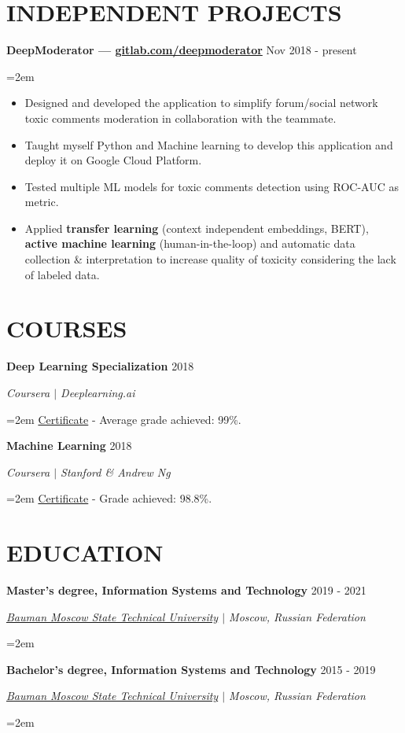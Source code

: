 \documentclass{article}
\newcommand{\NewPart}[1]{\section*{{\color{gray}\uppercase{#1}}}}
\newcommand{\ExperienceEntry}[4]{
		\noindent \textbf{#1} \hfill  
		\hfill #2 \par  %
		\noindent \textit{#3} \par        %
		\noindent\hangindent=2em\hangafter=0 \small #4 %
		\normalsize \par}
\begin{document}
\NewPart{Independent Projects}{}
\ExperienceEntry
{DeepModerator  --- {\href{https://gitlab.com/deepmoderator} {gitlab.com/deepmoderator}}}
{Nov 2018 - present}
{}
{\begin{itemize}
	\item{Designed and developed the application to simplify forum/social network toxic comments moderation in collaboration with the teammate.}
	\item{Taught myself Python and Machine learning to develop this application and deploy it on Google Cloud Platform.}
	\item{Tested multiple ML models for toxic comments detection using ROC-AUC as metric.}
	\item{Applied \textbf{transfer learning} (context independent embeddings, BERT), \textbf{active machine learning} (human-in-the-loop) and automatic data collection \& interpretation to increase quality of toxicity considering the lack of labeled data.}
\end{itemize}
}

\NewPart{Courses}{}
\ExperienceEntry
{Deep Learning Specialization}
{2018}
{Coursera $\vert$ Deeplearning.ai}
{\href{https://www.coursera.org/account/accomplishments/specialization/V5P6NWX4CR95} {Certificate} - Average grade achieved: 99\%.}
\ExperienceEntry
{Machine Learning}
{2018}
{Coursera $\vert$ Stanford \& Andrew Ng}
{\href{https://www.coursera.org/account/accomplishments/certificate/W2FV6BT5XCPF} {Certificate} - Grade achieved: 98.8\%.}

\NewPart{Education}{}
\ExperienceEntry
{Master's degree, Information Systems and Technology}
{2019 - 2021}
{\href{http://bmstu.ru/en}{Bauman Moscow State Technical University} $\vert$ Moscow, Russian Federation}
{}
\ExperienceEntry
{Bachelor's degree, Information Systems and Technology}
{2015 - 2019}
{\href{http://bmstu.ru/en}{Bauman Moscow State Technical University} $\vert$ Moscow, Russian Federation}
{}
\end{document}
